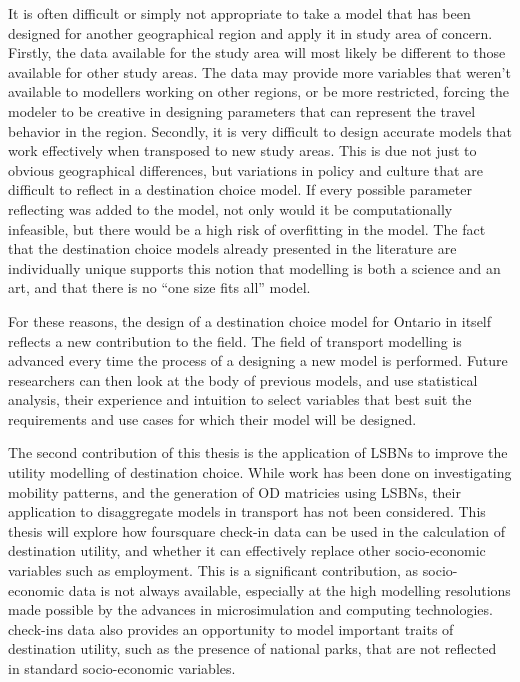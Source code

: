 It is often difficult or simply not appropriate to take a model that has been designed for another geographical region and apply it in study area of concern. Firstly, the data available for the study area will most likely be different to those available for other study areas. The data may provide more variables that weren't available to modellers working on other regions, or be more restricted, forcing the modeler to be creative in designing parameters that can represent the travel behavior in the region. Secondly, it is very difficult to design accurate models that work effectively when transposed to new study areas. This is due not just to obvious geographical differences, but variations in policy and culture that are difficult to reflect in a destination choice model. If every possible parameter reflecting was added to the model, not only would it be computationally infeasible, but there would be a high risk of overfitting in the model. The fact that the destination choice models already presented in the literature are individually unique supports this notion that modelling is both a science and an art, and that there is no \enquote{one size fits all} model.

For these reasons, the design of a destination choice model for Ontario in itself reflects a new contribution to the field.  The field of transport modelling is advanced every time the process of a designing a new model is performed. Future researchers can then look at the body of previous models, and use statistical analysis, their experience and intuition to select variables that best suit the requirements and use cases for which their model will be designed. 

The second contribution of this thesis is the application of LSBNs to improve the utility modelling of destination choice. While work has been done on investigating mobility patterns, and the generation of OD matricies using LSBNs, their application to disaggregate models in transport has not been considered. This thesis will explore how foursquare check-in data can be used in the calculation of destination utility, and whether it can effectively replace other socio-economic variables such as employment. This is a significant contribution, as socio-economic data is not always available, especially at the high modelling resolutions made possible by the advances in microsimulation and computing technologies. check-ins data also provides an opportunity to model important traits of destination utility, such as the presence of national parks, that are not reflected in standard socio-economic variables.

